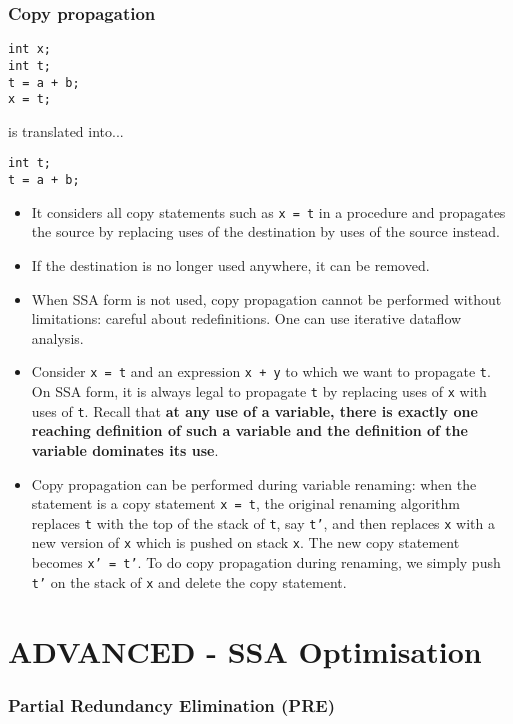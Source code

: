 \documentclass[a4paper,12pt, notitlepage]{article}
\begin{document}
\subsubsection*{Copy propagation}
\begin{verbatim}
int x;
int t;
t = a + b;
x = t;
\end{verbatim} \vspace{-0.3cm}
is translated into... \vspace{-0.3cm}
\begin{verbatim}
int t;
t = a + b;
\end{verbatim}

\begin{itemize}
\item It considers all copy statements such as \texttt{x = t} in a procedure and
propagates the source by replacing uses of the destination by uses of the source
instead.
\item If the destination is no longer used anywhere, it can be removed.
\item When SSA form is not used, copy propagation cannot be performed without
limitations: careful about redefinitions. One can use iterative dataflow
analysis.
\item Consider \texttt{x = t} and an expression \texttt{x + y} to which we want
to propagate \texttt{t}. On SSA form, it is always legal to propagate \texttt{t}
by replacing uses of \texttt{x} with uses of \texttt{t}. Recall that \textbf{at
any use of a variable, there is exactly one reaching definition of such a
variable and the definition of the variable dominates its use}.
\item Copy propagation can be performed during variable renaming: when the
statement is a copy statement \texttt{x = t}, the original renaming algorithm
replaces \texttt{t} with the top of the stack of \texttt{t}, say \texttt{t'},
and then replaces \texttt{x} with a new version of \texttt{x} which is
pushed on stack \texttt{x}. The new copy statement becomes \texttt{x' =
t'}. To do copy propagation during renaming, we simply push
\texttt{t'} on the stack of \texttt{x} and delete the copy
statement.

\end{itemize}


\pagebreak
\section*{ADVANCED - SSA Optimisation}
\subsubsection*{Partial Redundancy Elimination (PRE)}
\end{document}
